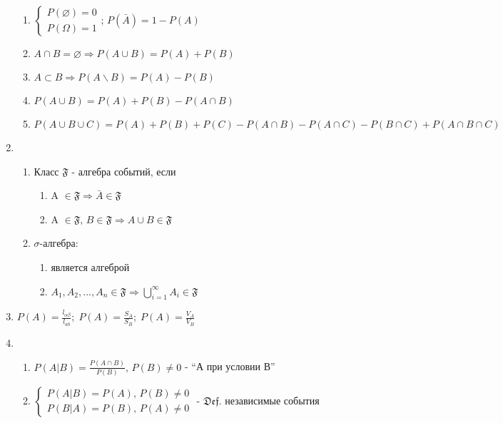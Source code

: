 \begin{enumerate}[label=\textbf{\underline{\arabic*.}}]
\begin{enumerate}
      \item $\left\{\begin{array}{l} P(\varnothing)=0\\P(\Omega)=1 \end{array}\right.$; $ P(\bar{A})=1-P(A) $
      \item $A\cap B=\varnothing \Rightarrow P(A\cup B)=P(A)+P(B)$
      \item $A\subset B\Rightarrow P(A\backslash B)=P(A)-P(B)$
      \item $P(A\cup B)=P(A)+P(B)-P(A\cap B)$
      \item $P(A\cup B\cup C)=P(A)+P(B)+P(C)-P(A\cap B)-P(A\cap C)-P(B\cap C)+P(A\cap B\cap C)$
      \end{enumerate}
\item \begin{enumerate}
      \item Класс $\mathfrak{F}$ - алгебра событий, если
            \begin{enumerate}
            \item A $\in \mathfrak{F} \Rightarrow \bar{A} \in \mathfrak{F}$
            \item A $\in \mathfrak{F},\, B \in \mathfrak{F} \Rightarrow A\cup B\in \mathfrak{F}$
            \end{enumerate}
      \item $\sigma$-алгебра:
            \begin{enumerate}
            \item является алгеброй
            \item $A_1,A_2,...,A_n \in \mathfrak{F} \Rightarrow \bigcup\limits_{i=1}^\infty A_i \in \mathfrak{F}$
            \end{enumerate}
      \end{enumerate}
\item $ P(A) = \frac{l_{\alpha\beta}}{l_{ab}};\;P(A)=\frac{S_A}{S_B};\; P(A) = \frac{V_A}{V_B} $\\
\item \begin{enumerate}
      \item $P(A|B)=\frac{P(A\cap B)}{P(B)},\,P(B)\neq 0$ - ``А при условии В''
      \item $\left\{\begin{array}{l}
            P(A|B)=P(A),\,P(B)\neq 0\\
            P(B|A)=P(B),\,P(A)\neq 0
            \end{array}\right. $ - $ \mathfrak{Def.}$ независимые события

\end{enumerate}
\end{enumerate}
